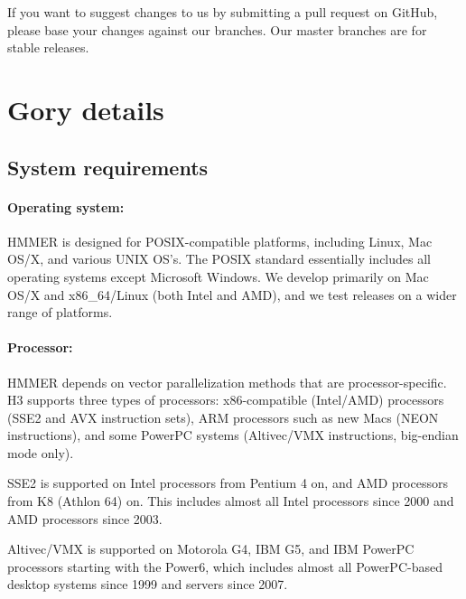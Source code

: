 If you want to suggest changes to us by submitting a pull request on
GitHub, please base your changes against our  branches.
Our master branches are for stable releases.



\section{Gory details}

\subsection{System requirements}

\paragraph{Operating system:} HMMER is designed for
POSIX-compatible platforms, including Linux, Mac OS/X, and various
UNIX OS's. The POSIX standard essentially includes all operating
systems except Microsoft Windows.  We develop primarily on Mac OS/X and x86\_64/Linux
(both Intel and AMD), and we test releases on a wider range of
platforms.
  
\paragraph{Processor:} HMMER depends on vector parallelization methods
that are processor-specific. H3 supports three types of processors:
x86-compatible (Intel/AMD) processors (SSE2 and AVX instruction sets),
ARM processors such as new Macs (NEON instructions), and some PowerPC
systems (Altivec/VMX instructions, big-endian mode only).

SSE2 is supported on Intel processors from Pentium 4 on, and AMD
processors from K8 (Athlon 64) on. This includes almost all Intel
processors since 2000 and AMD processors since 2003.

Altivec/VMX is supported on Motorola G4, IBM G5, and IBM PowerPC
processors starting with the Power6, which includes almost all
PowerPC-based desktop systems since 1999 and servers since
2007.

